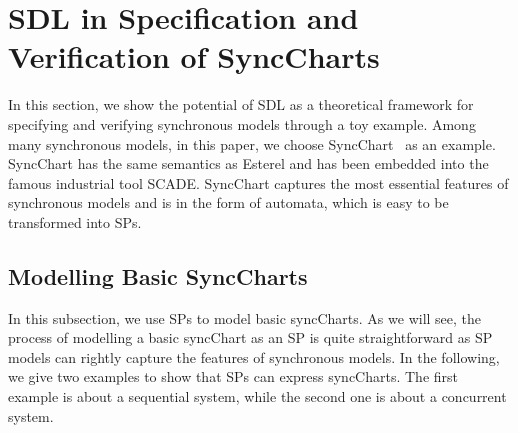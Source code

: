 \documentclass{fcs}
\begin{document}
\section{SDL in Specification and Verification of SyncCharts}
\label{section:SDL in Specification and Verification of SyncCharts}
In this section, we show the potential of SDL as a theoretical framework for specifying and verifying synchronous models through a toy example.
Among many synchronous models, in this paper, we choose SyncChart~\cite{Andre03} as an example.
SyncChart has the same semantics as Esterel and has been embedded into the famous industrial tool SCADE.
SyncChart captures the most essential features of synchronous models and is in the form of automata, which is easy to be transformed into SPs.




\subsection{Modelling Basic SyncCharts}
\label{section:Encoding Basic SyncCharts}
In this subsection, we use SPs to model basic syncCharts.
As we will see, the process of modelling a basic syncChart as an SP is quite straightforward as SP models can rightly capture the features of synchronous models.
In the following, we give two examples to show that SPs can express syncCharts.
The first example is about a sequential system, while the second one is about a concurrent system.
\end{document}
